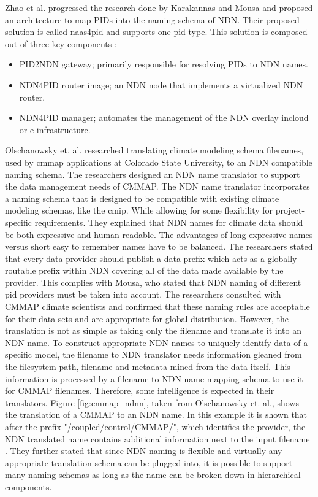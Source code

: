 Zhao et al. progressed the research done by Karakannas \cite{icn-bd} and Mousa \cite{ndn-app-aware} and proposed an architecture to map PIDs into the naming schema of NDN. Their proposed solution is called \gls{naas4pid} and supports one \gls{pid} type. This solution is composed out of three key components \cite{koulouzis2018information}:
\begin{itemize}
  \item PID2NDN gateway; primarily responsible for resolving PIDs to NDN names.
  \item NDN4PID router image; an NDN node that implements a virtualized NDN router.
  \item NDN4PID manager; automates the management of the NDN overlay in\newline cloud or e-infrastructure.
\end{itemize}

Olschanowsky et. al. researched translating climate modeling schema filenames, used by \gls{cmmap} applications at Colorado State University, to an NDN compatible 
naming schema. The researchers designed an NDN name translator to support the data management needs of CMMAP. The NDN name translator incorporates a naming schema that is designed to be compatible with existing climate modeling schemas, like the \gls{cmip}. While allowing for some flexibility for project-specific requirements. They explained that NDN names for climate data should be both expressive and human readable. The advantages of long expressive names versus short easy to remember names have to be balanced.
The researchers stated that every data provider should publish a data prefix which acts as a globally
routable prefix within NDN covering all of the data made available by the provider. This complies with Mousa, who stated that NDN naming of different \gls{pid} providers must be taken into account. The researchers consulted with CMMAP climate scientists and confirmed that these naming rules are acceptable for their data sets and are appropriate for global distribution. 
However, the translation is not as simple as taking only the filename and translate it into an NDN name. To construct appropriate NDN names to uniquely identify data of a specific model, the filename to NDN translator needs information gleaned from the filesystem path, filename and metadata mined from the data itself. This information is processed by a filename to NDN name mapping schema to use it for CMMAP filenames. Therefore, some intelligence is expected in their translators.
Figure \ref{fig:cmmap_ndnn}, taken from Olschanowsky et. al., shows the translation of a CMMAP to an NDN name. In this example it is shown that after the prefix \url{"/coupled/control/CMMAP/"}, which identifies the provider, the NDN translated name contains additional information next to the input filename \cite{ndn-clim}.
They further stated that since NDN naming is flexible and virtually any appropriate translation schema can be plugged into, it is possible to support many naming schemas as long as the name can be broken down in hierarchical components.

